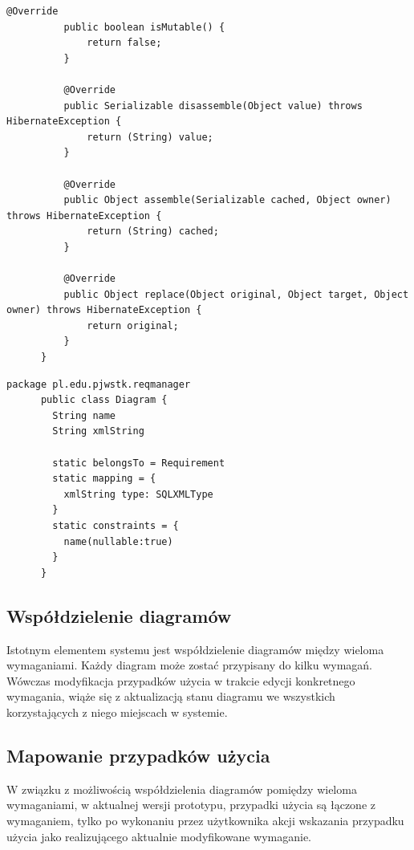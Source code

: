 \begin{lstlisting}[caption={Implementacja niestandardowego typu SQLXMLType}, label={lst:xmlType}]
          @Override
          public boolean isMutable() {
              return false;
          }
       
          @Override
          public Serializable disassemble(Object value) throws HibernateException {
              return (String) value;
          }
       
          @Override
          public Object assemble(Serializable cached, Object owner) throws HibernateException {
              return (String) cached;
          }
       
          @Override
          public Object replace(Object original, Object target, Object owner) throws HibernateException {
              return original;
          }
      }
      \end{lstlisting}

      \newpage

      \begin{lstlisting}[caption={Implementacja modelu Diagram}, label={lst:xml}]
      package pl.edu.pjwstk.reqmanager
      public class Diagram {
        String name
        String xmlString

        static belongsTo = Requirement
        static mapping = {
          xmlString type: SQLXMLType
        }
        static constraints = {
          name(nullable:true)
        }
      }
      \end{lstlisting}

    \subsection{Współdzielenie diagramów}

    Istotnym elementem systemu jest współdzielenie diagramów między wieloma wymaganiami. Każdy diagram może zostać przypisany do kilku wymagań. Wówczas modyfikacja przypadków użycia w trakcie edycji konkretnego wymagania, wiąże się z aktualizacją stanu diagramu we wszystkich korzystających z niego miejscach w systemie.
    
    \subsection{Mapowanie przypadków użycia}
      W związku z możliwością współdzielenia diagramów pomiędzy wieloma wymaganiami, w aktualnej wersji prototypu, przypadki użycia są łączone z wymaganiem, tylko po wykonaniu przez użytkownika akcji wskazania przypadku użycia jako realizującego aktualnie modyfikowane wymaganie.

